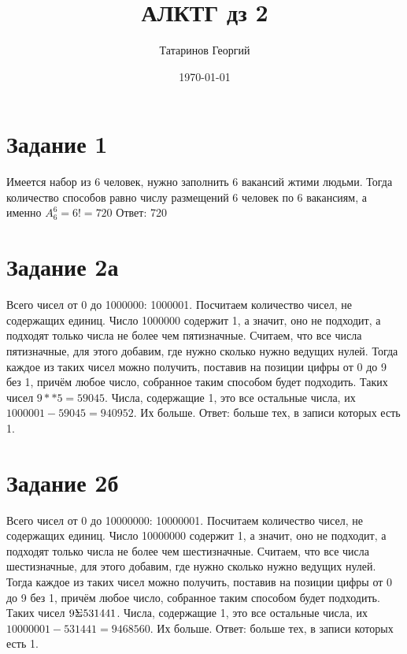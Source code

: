 \documentclass[a4paper, 12pt]{article}
\title{АЛКТГ дз 2}
\author{Татаринов Георгий}
\date{\today}
\begin{document}
	\section*{Задание 1}
		Имеется набор из 6 человек, нужно заполнить 6 вакансий жтими людьми. Тогда количество способов равно числу размещений 6 человек по 6 вакансиям, а именно $A_6^6=6!=720$
		Ответ: 720
	\section*{Задание 2а}
		Всего чисел от 0 до 1000000: 1000001. Посчитаем количество чисел, не содержащих единиц. Число 1000000 содержит 1, а значит, оно не подходит, а подходят только числа не более чем пятизначные. Считаем, что все числа пятизначные, для этого добавим, где нужно сколько нужно ведущих нулей. Тогда каждое из таких чисел можно получить, поставив на позиции цифры от 0 до 9 без 1, причём любое число, собранное таким способом будет подходить. Таких чисел $9**5=59045$. Числа, содержащие 1, это все остальные числа, их $1000001-59045=940952$. Их больше.
		Ответ: больше тех, в записи которых есть 1.
	\section*{Задание 2б}
		Всего чисел от 0 до 10000000: 10000001. Посчитаем количество чисел, не содержащих единиц. Число 10000000 содержит 1, а значит, оно не подходит, а подходят только числа не более чем шестизначные. Считаем, что все числа шестизначные, для этого добавим, где нужно сколько нужно ведущих нулей. Тогда каждое из таких чисел можно получить, поставив на позиции цифры от 0 до 9 без 1, причём любое число, собранное таким способом будет подходить. Таких чисел $9\mathaccent6=531441$. Числа, содержащие 1, это все остальные числа, их $10000001-531441=9468560$. Их больше.
		Ответ: больше тех, в записи которых есть 1.
\end{document}

